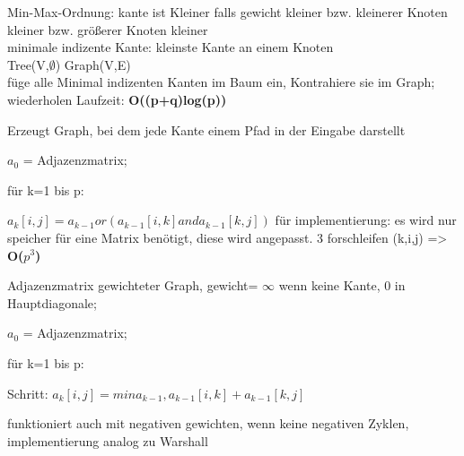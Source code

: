 Min-Max-Ordnung: kante ist Kleiner falls gewicht kleiner bzw. kleinerer Knoten kleiner bzw. größerer Knoten kleiner\\
minimale indizente Kante: kleinste Kante an einem Knoten\\
 Tree(V,$\emptyset$) Graph(V,E)\\
 füge alle Minimal indizenten Kanten im Baum ein, Kontrahiere sie im Graph; wiederholen
Laufzeit: \textbf{O((p+q)log(p))}

Erzeugt Graph, bei dem jede Kante einem Pfad in der Eingabe darstellt


 $a_0$ = Adjazenzmatrix;

für k=1 bis p: 

 $a_k[i,j] = a_{k-1} or( a_{k-1}[i,k] and a_{k-1}[k,j] )$
für implementierung: es wird nur speicher für eine Matrix benötigt, diese wird angepasst. 3 forschleifen (k,i,j) => 
\textbf{O($p^3$)}

Adjazenzmatrix gewichteter Graph, gewicht= $\infty$ wenn keine Kante, 0 in Hauptdiagonale;

 $a_0$ = Adjazenzmatrix;

für k=1 bis p: 

 Schritt: $a_k[i,j] = min{a_{k-1} , a_{k-1}[i,k] + a_{k-1}[k,j] }$

funktioniert auch mit negativen gewichten, wenn keine negativen Zyklen, implementierung analog zu Warshall
